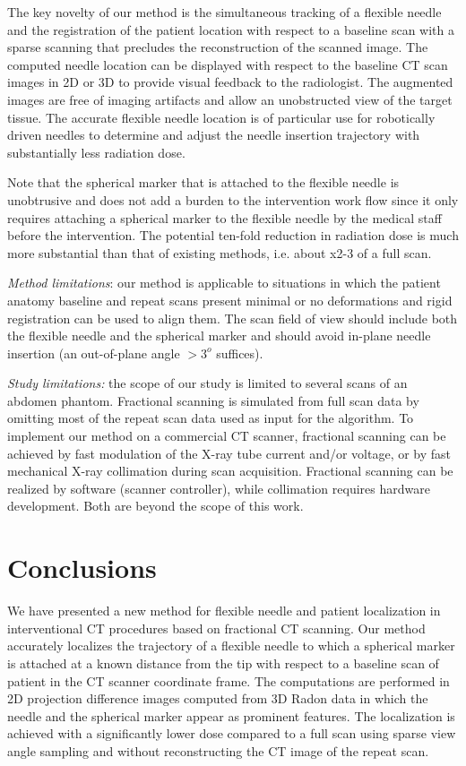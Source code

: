 The key novelty of our method is the simultaneous tracking of a flexible needle and the registration of the patient location with respect to a baseline scan with a sparse scanning that precludes the reconstruction of the scanned image.  The computed needle location can be displayed with respect to the baseline CT scan images in 2D or 3D to provide visual feedback to the radiologist. The augmented images are free of imaging artifacts and allow an unobstructed view of the target tissue. The accurate flexible needle location is of particular use for robotically driven needles to determine and adjust the needle insertion trajectory with substantially less radiation dose. 

Note that the spherical marker that is attached to the flexible needle is unobtrusive and does not add a burden to the intervention work flow since it only requires attaching a spherical marker to the flexible needle by the medical staff before the intervention. The potential ten-fold reduction in radiation dose is much more substantial than that of existing methods, i.e. about x2-3 of a full scan. 

{\em Method limitations}: our method is applicable to situations in which the patient anatomy baseline and repeat scans present minimal or no deformations and rigid registration can be used to align them. The scan field of view should include both the flexible needle and the spherical marker and should avoid in-plane needle insertion (an out-of-plane angle $>3^o$ suffices). 

{\em Study limitations:} the scope of our study is limited to several scans of an abdomen phantom. Fractional scanning is simulated from full scan data by omitting most of the repeat scan data used as input for the algorithm. To implement our method on a commercial CT scanner, fractional scanning can be achieved by fast modulation of the X-ray tube current and/or voltage, or by fast mechanical X-ray  collimation during scan acquisition. Fractional scanning can be realized by software (scanner controller), while collimation requires hardware development.  Both are beyond the scope of this work.
 
\section*{Conclusions}
We have presented a new method for flexible needle and patient localization in interventional CT procedures based on fractional CT scanning.
Our method accurately localizes the trajectory of a flexible needle to which a spherical marker is attached at a known distance from the tip with respect to a baseline scan of patient in the CT scanner coordinate frame. The computations are performed in 2D projection difference images computed from 3D Radon data in which the needle and the spherical marker appear as prominent features. 
The localization is achieved with a significantly lower dose compared to a full scan using sparse view angle sampling and without reconstructing the CT image of the repeat scan.

